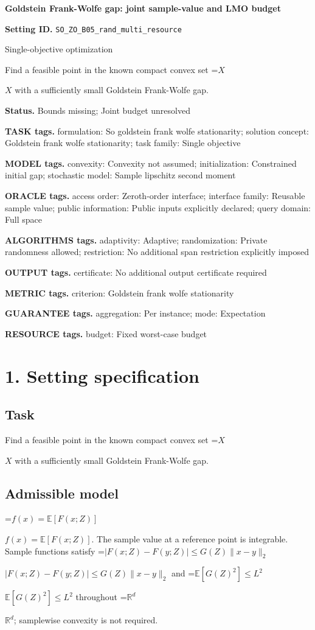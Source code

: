 \documentclass[10pt,a4paper]{article}
\newcommand{\AtlasMath}[1]{\par\begingroup\centering\setbox0=\hbox{$\displaystyle #1$}\ifdim\wd0>1.4\linewidth\typeout{ATLAS WIDE FORMULA: \the\wd0}\fi\ifdim\wd0>\linewidth\resizebox{\linewidth}{!}{\box0}\else\box0\fi\par\endgroup}
\newcommand{\AtlasInlineMath}[1]{\begingroup\setbox0=\hbox{$#1$}\ifdim\wd0>.4\linewidth\endgroup\AtlasMath{#1}\else\endgroup$#1$\fi}
\begin{document}
\raggedright

{\LARGE\bfseries\sffamily\color{AtlasNavy} Goldstein Frank-Wolfe gap: joint sample-value and LMO budget\par}\vspace{5pt}
\textbf{Setting ID.} \texttt{SO\_\allowbreak{}ZO\_\allowbreak{}B05\_\allowbreak{}rand\_\allowbreak{}multi\_\allowbreak{}resource}

Single-objective optimization

Find a feasible point in the known compact convex set \AtlasInlineMath{X} with a sufficiently small Goldstein Frank-Wolfe gap.

\textbf{Status.} Bounds missing; Joint budget unresolved

\textbf{TASK tags.} formulation: So goldstein frank wolfe stationarity; solution concept: Goldstein frank wolfe stationarity; task family: Single objective

\textbf{MODEL tags.} convexity: Convexity not assumed; initialization: Constrained initial gap; stochastic model: Sample lipschitz second moment

\textbf{ORACLE tags.} access order: Zeroth-order interface; interface family: Reusable sample value; public information: Public inputs explicitly declared; query domain: Full space

\textbf{ALGORITHMS tags.} adaptivity: Adaptive; randomization: Private randomness allowed; restriction: No additional span restriction explicitly imposed

\textbf{OUTPUT tags.} certificate: No additional output certificate required

\textbf{METRIC tags.} criterion: Goldstein frank wolfe stationarity

\textbf{GUARANTEE tags.} aggregation: Per instance; mode: Expectation

\textbf{RESOURCE tags.} budget: Fixed worst-case budget

\section{1. Setting specification}
\subsection{Task}
Find a feasible point in the known compact convex set \AtlasInlineMath{X} with a sufficiently small Goldstein Frank-Wolfe gap.

\subsection{Admissible model}
\AtlasInlineMath{f(x)=\mathbb{E}[F(x;Z)]}. The sample value at a reference point is integrable. Sample functions satisfy \AtlasInlineMath{|F(x;Z)-F(y;Z)|\le G(Z)\|x-y\|_2} and \AtlasInlineMath{\mathbb{E}[G(Z)^2]\le L^2} throughout \AtlasInlineMath{\mathbb{R}^d}; samplewise convexity is not required.
\end{document}
